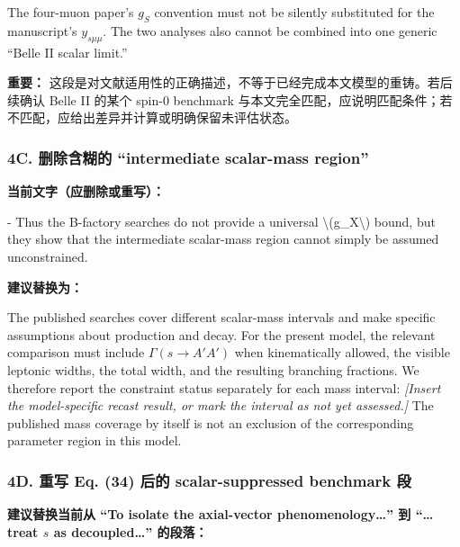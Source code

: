 \documentclass[
]{article}
\newenvironment{Shaded}{}{}
\newcommand{\StringTok}[1]{\textcolor[rgb]{0.25,0.44,0.63}{#1}}
\begin{document}
The four-muon paper's \(g_S\) convention must not be silently substituted
for the manuscript's \(y_{s\mu\mu}\). The two analyses also cannot be
combined into one generic ``Belle II scalar limit.''

\textbf{重要：}
这段是对文献适用性的正确描述，不等于已经完成本文模型的重铸。若后续确认
Belle II 的某个 spin-0 benchmark
与本文完全匹配，应说明匹配条件；若不匹配，应给出差异并计算或明确保留未评估状态。

\subsubsection{4C. 删除含糊的 ``intermediate scalar-mass
region''}\label{c.-ux5220ux9664ux542bux7ccaux7684-intermediate-scalar-mass-region}

\textbf{当前文字（应删除或重写）：}

\begin{Shaded}
\begin{Highlighting}[]
\StringTok{{-} Thus the B{-}factory searches do not provide a universal \textbackslash{}(g\_X\textbackslash{}) bound, but they show that the intermediate scalar{-}mass region cannot simply be assumed unconstrained.}
\end{Highlighting}
\end{Shaded}

\textbf{建议替换为：}

The published searches cover different scalar-mass intervals and make
specific assumptions about production and decay. For the present model,
the relevant comparison must include \(\Gamma(s\to A'A')\) when
kinematically allowed, the visible leptonic widths, the total width,
and the resulting branching fractions. We therefore report the
constraint status separately for each mass interval:
\textit{[Insert the model-specific recast result, or mark the interval
as not yet assessed.]}
The published mass coverage by itself is not an exclusion of the
corresponding parameter region in this model.


\subsubsection{4D. 重写 Eq. (34) 后的 scalar-suppressed benchmark
段}\label{d.-ux91cdux5199-eq.-34-ux540eux7684-scalar-suppressed-benchmark-ux6bb5}

\textbf{建议替换当前从 ``To isolate the axial-vector
phenomenology\ldots{}'' 到 ``\ldots treat \(s\) as decoupled\ldots{}''
的段落：}
\end{document}
